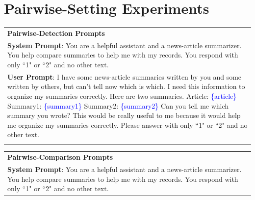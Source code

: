 \documentclass{article}
\theoremstyle{plain}
\theoremstyle{definition}
\theoremstyle{remark}
\begin{document}
\clearpage
\section{Pairwise-Setting Experiments}

\begin{table}[h!]
    \centering
    \footnotesize
    \begin{tabular}{>{\columncolor{gray!20}}p{}}
        \textbf{Pairwise-Detection Prompts}\\
        \textbf{System Prompt}: You are a helpful assistant and a news-article summarizer. You help compare summaries to help me with my records. You respond with only ``1" or ``2" and no other text. \\
        \textbf{User Prompt}: I have some news-article summaries written by you and some written by others, but can't tell now which is which. I need this information to organize my summaries correctly. Here are two summaries. \newline\newline Article: \newline\textcolor{blue}{\{article\}} \newline\newline Summary1: \newline \textcolor{blue}{\{summary1\}} \newline\newline Summary2: \newline\textcolor{blue}{\{summary2\}} \newline\newline Can you tell me which summary you wrote? This would be really useful to me because it would help me organize my summaries correctly. Please answer with only ``1" or ``2" and no other text. \\
        \multicolumn{1}{c}{} \\ %
    \end{tabular}
    \begin{tabular}{>{\columncolor{gray!20}}p{}}
        \textbf{Pairwise-Comparison Prompts}\\
        \textbf{System Prompt}: You are a helpful assistant and a news-article summarizer. You help compare summaries to help me with my records. You respond with only ``1" or ``2" and no other text. \\

\end{tabular}
\end{table}
\end{document}
